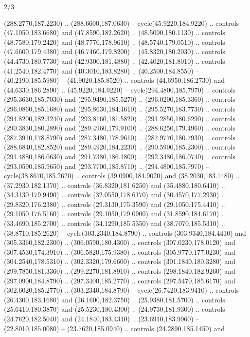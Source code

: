 \begin{flagdescription}{2/3}
\begin{scope}[xshift=0.5\flaglength,yshift=0.5\flagwidth,scale=\stretchfactor]
\begin{scope}[scale=0.001645\flagwidth,yshift=65mm,xshift=-63mm]
\begin{scope}[y=0.80pt, x=0.80pt, yscale=-1,]
\begin{scope}[cm={{1.33333,0.0,0.0,1.33333,(0.0,1e-05)}}]
  (288.2770,187.2230) .. (288.6600,187.0630) -- cycle(45.9220,184.9220) ..
  controls (47.1050,183.6680) and (47.8590,182.2620) .. (48.5000,180.1130) ..
  controls (48.7580,179.2420) and (48.7770,178.9610) .. (48.5740,179.0510) ..
  controls (47.6600,179.4380) and (46.7460,179.8200) .. (45.8320,180.2030) ..
  controls (44.4730,180.7730) and (42.9300,181.4880) .. (42.4020,181.8010) ..
  controls (41.2540,182.4770) and (40.3010,183.8280) .. (40.2500,184.8550) --
  (40.2190,185.5980) -- (41.9020,185.8520) .. controls (44.6950,186.2730) and
  (44.6330,186.2890) .. (45.9220,184.9220) -- cycle(294.4800,185.7970) ..
  controls (295.3630,185.7030) and (295.9490,185.5270) .. (296.0200,185.3360) ..
  controls (296.0860,185.1680) and (295.8630,184.4610) .. (295.5270,183.7730) ..
  controls (294.8200,182.3240) and (293.8160,181.5820) .. (291.2850,180.6290) ..
  controls (290.3830,180.2890) and (289.4960,179.9100) .. (288.6250,179.4960) ..
  controls (287.3910,178.8790) and (287.3480,178.9610) .. (287.9770,180.7930) ..
  controls (288.6840,182.8520) and (289.4920,184.2230) .. (290.5900,185.2300) ..
  controls (291.4880,186.0630) and (291.7380,186.1800) .. (292.3480,186.0740) ..
  controls (293.0590,185.9650) and (293.7700,185.8710) .. (294.4800,185.7970) --
  cycle(38.8670,185.2620) .. controls (39.0900,184.9020) and (38.2030,183.1480)
  .. (37.2930,182.1370) .. controls (36.8320,181.6250) and (35.4880,180.6410) ..
  (34.3130,179.9490) .. controls (32.0550,178.6170) and (30.4570,177.2930) ..
  (29.8320,176.2380) .. controls (29.3130,175.3590) and (29.1050,175.4410) ..
  (29.1050,176.5160) .. controls (29.1050,179.0900) and (31.8590,184.6170) ..
  (33.4690,185.2700) .. controls (34.1290,185.5350) and (38.7070,185.5310) ..
  (38.8710,185.2620) -- cycle(303.2340,184.8790) .. controls (303.9340,184.4410)
  and (305.3360,182.2300) .. (306.0590,180.4300) .. controls (307.0230,178.0120)
  and (307.4530,174.3910) .. (306.5820,175.9380) .. controls (305.9770,177.0230)
  and (304.2540,178.5310) .. (302.3320,179.6600) .. controls (301.1840,180.3280)
  and (299.7850,181.3360) .. (299.2270,181.8910) .. controls (298.1840,182.9260)
  and (297.0900,184.8790) .. (297.3400,185.2770) .. controls (297.5470,185.6170)
  and (302.6020,185.2770) .. (303.2340,184.8790) -- cycle(26.7420,183.9410) ..
  controls (26.4300,183.1680) and (26.1600,182.3750) .. (25.9380,181.5700) ..
  controls (25.6410,180.3870) and (25.5230,180.4300) .. (24.9730,181.9300) ..
  controls (24.7620,182.5040) and (24.1840,183.4340) .. (23.6910,183.9960) --
  (22.8010,185.0080) -- (23.7620,185.0940) .. controls (24.2890,185.1450) and

\end{scope}
\end{scope}
\end{scope}
\end{scope}
\end{flagdescription}
